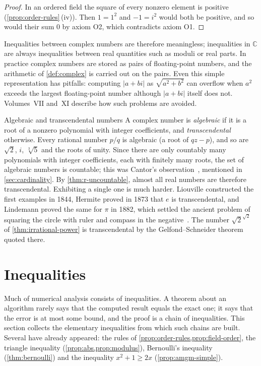 \begin{proof}
In an ordered field the square of every nonzero element is positive (\cref{prop:order-rules}\,(iv)). Then $1=1^2$ and $-1=i^2$ would both be positive, and so would their sum $0$ by axiom O2, which contradicts axiom O1.
\end{proof}

Inequalities between complex numbers are therefore meaningless; inequalities in $\mathbb C$ are always inequalities between real quantities such as moduli or real parts. In practice complex numbers are stored as pairs of floating-point numbers, and the arithmetic of \cref{def:complex} is carried out on the pairs. Even this simple representation has pitfalls: computing $|a+bi|$ as $\sqrt{a^2+b^2}$ can overflow when $a^2$ exceeds the largest floating-point number although $|a+bi|$ itself does not. Volumes~VII and~XI describe how such problems are avoided.

\begin{note}{Algebraic and transcendental numbers}
A complex number is \emph{algebraic} if it is a root of a nonzero polynomial with integer coefficients, and \emph{transcendental} otherwise. Every rational number $p/q$ is algebraic (a root of $qz-p$), and so are $\sqrt2$, $i$, $\sqrt[3]{5}$ and the roots of unity. Since there are only countably many polynomials with integer coefficients, each with finitely many roots, the set of algebraic numbers is countable; this was Cantor's observation~\cite{cantor1874}, mentioned in \cref{sec:cardinality}. By \cref{thm:r-uncountable}, almost all real numbers are therefore transcendental. Exhibiting a single one is much harder. Liouville constructed the first examples in 1844, Hermite proved in 1873 that $e$ is transcendental, and Lindemann proved the same for $\pi$ in 1882, which settled the ancient problem of squaring the circle with ruler and compass in the negative~\cite{baker1975,hardywright2008}. The number $\sqrt2^{\sqrt2}$ of \cref{thm:irrational-power} is transcendental by the Gelfond--Schneider theorem quoted there.
\end{note}

\section{Inequalities}
\label{sec:inequalities}

Much of numerical analysis consists of inequalities. A theorem about an algorithm rarely says that the computed result equals the exact one; it says that the error is at most some bound, and the proof is a chain of inequalities. This section collects the elementary inequalities from which such chains are built. Several have already appeared: the rules of \cref{prop:order-rules,prop:field-order}, the triangle inequality (\cref{prop:abs,prop:modulus}), Bernoulli's inequality (\cref{thm:bernoulli}) and the inequality $x^2+1\ge2x$ (\cref{prop:amgm-simple}).

